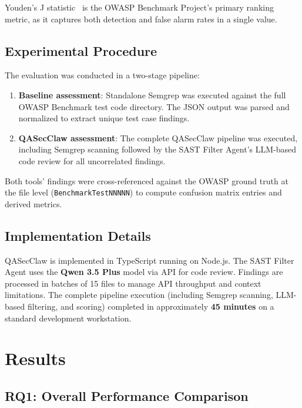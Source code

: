 \documentclass[conference]{IEEEtran}
\begin{document}
Youden's J statistic~\cite{youden1950index} is the OWASP Benchmark Project's primary ranking metric, as it captures both detection and false alarm rates in a single value.

\subsection{Experimental Procedure}
The evaluation was conducted in a two-stage pipeline:
\begin{enumerate}
    \item \textbf{Baseline assessment}: Standalone Semgrep was executed against the full OWASP Benchmark test code directory. The JSON output was parsed and normalized to extract unique test case findings.
    \item \textbf{QASecClaw assessment}: The complete QASecClaw pipeline was executed, including Semgrep scanning followed by the SAST Filter Agent's LLM-based code review for all uncorrelated findings.
\end{enumerate}

Both tools' findings were cross-referenced against the OWASP ground truth at the file level (\texttt{BenchmarkTestNNNNN}) to compute confusion matrix entries and derived metrics.

\subsection{Implementation Details}
QASecClaw is implemented in TypeScript running on Node.js. The SAST Filter Agent uses the \textbf{Qwen 3.5 Plus} model via API for code review. Findings are processed in batches of 15 files to manage API throughput and context limitations. The complete pipeline execution (including Semgrep scanning, LLM-based filtering, and scoring) completed in approximately \textbf{45 minutes} on a standard development workstation.

\section{Results}
\label{sec:results}

\subsection{RQ1: Overall Performance Comparison}
\end{document}
